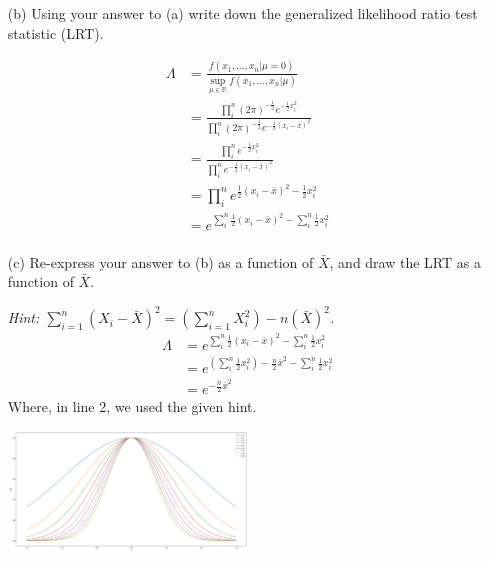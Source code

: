 \documentclass{article}
\newcommand{\field}[1]{\mathbb{#1}}
\newcommand{\1}{\mathbf{1}}
\newcommand{\R}{\field{R}} %
\begin{document}
\begin{itemize}
    \item[(b)]  Using your answer to (a) write down the generalized likelihood ratio test statistic (LRT).
    
    \begin{align*}
        \Lambda &= \frac{f(x_1,\hdots ,x_n|\mu=0)}{\sup_{\mu\in\R} f(x_1,\hdots ,x_n|\mu) } \\
        &= \frac{\prod_i^n  (2\pi)^{-\frac{1}{2}}e^{-\frac{1}{2}x_i^2}   }{\prod_i^n (2\pi)^{-\frac{1}{2}}e^{-\frac{1}{2}(x_i-\bar x)^2} } \\
        &= \frac{\prod_i^n  e^{-\frac{1}{2}x_i^2}   }{\prod_i^n e^{-\frac{1}{2}(x_i-\bar x)^2} } \\
        &= \prod_i^n  e^{\frac{1}{2}(x_i-\bar x)^2 -\frac{1}{2}x_i^2}  \\
        &= e^{  \sum_i^n \frac{1}{2}(x_i-\bar x)^2 -  \sum_i^n \frac{1}{2}x_i^2}  \\
    \end{align*}

    \item[(c)] Re-express your answer to (b) as a function of $\bar{X}$, and draw the LRT as a function of $\bar{X}$.\par
    {\it Hint: $\sum_{i=1}^n (X_i - \bar{X})^2  = \left(\sum_{i=1}^n X_i^2 \right) -n(\bar{X})^2$.}
    \begin{align*}
        \Lambda &= e^{  \sum_i^n \frac{1}{2}(x_i-\bar x)^2 -  \sum_i^n \frac{1}{2}x_i^2}  \\
        &= e^{ \left(\sum_i^n \frac{1}{2}x_i^2\right) - \frac{n}{2}\bar x^2 -  \sum_i^n \frac{1}{2}x_i^2}  \\
        &= e^{ -\frac{n}{2}\bar x^2 }
    \end{align*}
    Where, in line 2, we used the given hint.
    
    \begin{center}
        \includegraphics[width=0.5\textwidth]{STATS509/HW8/HW8Figures/problem6c.png}
    \end{center}
    
    

\end{itemize}
\end{document}
